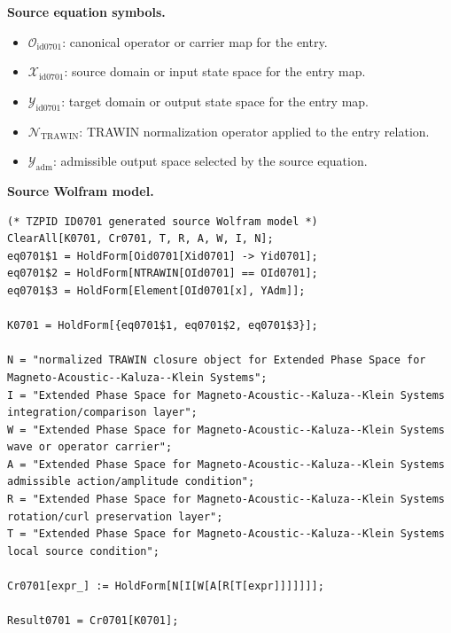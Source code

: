 \begin{minipage}[t]{0.49\linewidth}
\begingroup
\small
\raggedright
\textbf{Source equation symbols.}\par
\begin{itemize}[leftmargin=1.35em,itemsep=1pt,topsep=1pt,parsep=0pt]
    \item $\mathcal{O}_{\mathrm{id0701}}$: canonical operator or carrier map for the entry.
    \item $\mathcal{X}_{\mathrm{id0701}}$: source domain or input state space for the entry map.
    \item $\mathcal{Y}_{\mathrm{id0701}}$: target domain or output state space for the entry map.
    \item $\mathcal{N}_{\mathrm{TRAWIN}}$: TRAWIN normalization operator applied to the entry relation.
    \item $\mathcal{Y}_{\mathrm{adm}}$: admissible output space selected by the source equation.
\end{itemize}
\endgroup
\end{minipage}\hfill
\begin{minipage}[t]{0.47\linewidth}
\begingroup
\scriptsize
\raggedright
\textbf{Source Wolfram model.}\par
\begin{Verbatim}[fontsize=\tiny,breaklines=true,breakanywhere=true]
(* TZPID ID0701 generated source Wolfram model *)
ClearAll[K0701, Cr0701, T, R, A, W, I, N];
eq0701$1 = HoldForm[Oid0701[Xid0701] -> Yid0701];
eq0701$2 = HoldForm[NTRAWIN[OId0701] == OId0701];
eq0701$3 = HoldForm[Element[OId0701[x], YAdm]];

K0701 = HoldForm[{eq0701$1, eq0701$2, eq0701$3}];

N = "normalized TRAWIN closure object for Extended Phase Space for Magneto-Acoustic--Kaluza--Klein Systems";
I = "Extended Phase Space for Magneto-Acoustic--Kaluza--Klein Systems integration/comparison layer";
W = "Extended Phase Space for Magneto-Acoustic--Kaluza--Klein Systems wave or operator carrier";
A = "Extended Phase Space for Magneto-Acoustic--Kaluza--Klein Systems admissible action/amplitude condition";
R = "Extended Phase Space for Magneto-Acoustic--Kaluza--Klein Systems rotation/curl preservation layer";
T = "Extended Phase Space for Magneto-Acoustic--Kaluza--Klein Systems local source condition";

Cr0701[expr_] := HoldForm[N[I[W[A[R[T[expr]]]]]]];

Result0701 = Cr0701[K0701];
\end{Verbatim}
\endgroup
\end{minipage}

